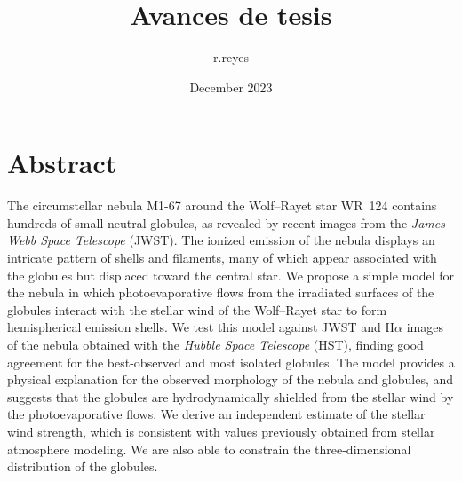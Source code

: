 \documentclass{book}
\title{Avances de tesis}
\author{r.reyes }
\date{December 2023}
\begin{document}
\begin{titlepage}

\end{titlepage}


\chapter*{Abstract}

The circumstellar nebula M1-67 around the Wolf–Rayet star WR~124
contains hundreds of small neutral globules, as revealed by recent
images from the \textit{James Webb Space Telescope} (JWST). The
ionized emission of the nebula displays an intricate pattern of shells
and filaments, many of which appear associated with the globules but
displaced toward the central star. We propose a simple model for the
nebula in which photoevaporative flows from the irradiated surfaces of
the globules interact with the stellar wind of the Wolf–Rayet star to
form hemispherical emission shells. We test this model against JWST
and H$\alpha$ images of the nebula obtained with the \textit{Hubble Space
  Telescope} (HST), finding good agreement for the best-observed and
most isolated globules. The model provides a physical explanation for
the observed morphology of the nebula and globules, and suggests that
the globules are hydrodynamically shielded from the stellar wind by
the photoevaporative flows. We derive an independent estimate of the
stellar wind strength, which is consistent with values previously
obtained from stellar atmosphere modeling. We are also able to
constrain the three-dimensional distribution of the globules.



\end{document}
